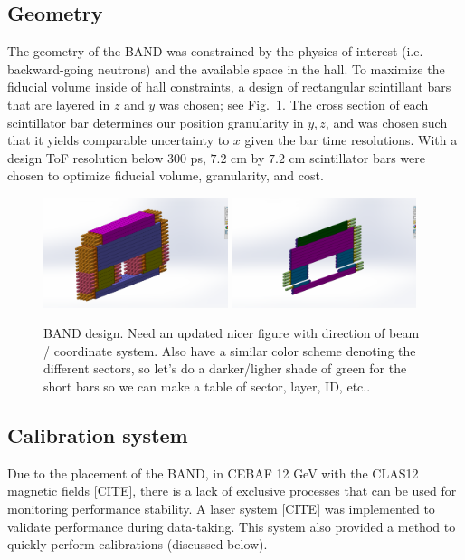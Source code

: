 \documentclass[review]{elsarticle}
\begin{document}
\subsection{Geometry}
The geometry of the BAND was constrained by the physics of interest (i.e. backward-going neutrons) \cite{Emcsrcdeens} and the available space in the hall. To
maximize the fiducial volume inside of hall constraints, a design of rectangular scintillant bars that are layered in $z$ and $y$ was chosen; see Fig.~\ref{fig:design}.
The cross section of each scintillator bar determines our position granularity in $y,z$, and was chosen such that it yields comparable uncertainty to $x$ given the bar 
time resolutions. With a design ToF resolution below $300$ \si{\pico\second}, $7.2$ \si{\centi\meter} by $7.2$ \si{\centi\meter} scintillator bars were chosen to optimize
fiducial volume, granularity, and cost.
\begin{figure}[h]
	\centering
		\includegraphics[width=0.48\textwidth]{Band01.png}
		\includegraphics[width=0.48\textwidth]{BandVeto.png}
		\caption{BAND design. Need an updated nicer figure with direction of beam / coordinate system. Also have a similar 
		color scheme denoting the different sectors, so let's do a darker/ligher shade of green for the short bars so we can make 
		a table of sector, layer, ID, etc..}
		\label{fig:design}
\end{figure}

\subsection{Calibration system}
Due to the placement of the BAND, in CEBAF 12 \si{\giga\electronvolt} with the CLAS12 magnetic fields [{\color{red}CITE}], there is a lack of exclusive processes 
that can be used for monitoring performance stability. A laser system [{\color{red}CITE}] was implemented to validate performance during data-taking. This system also 
provided a method to quickly perform calibrations (discussed below).
\end{document}

